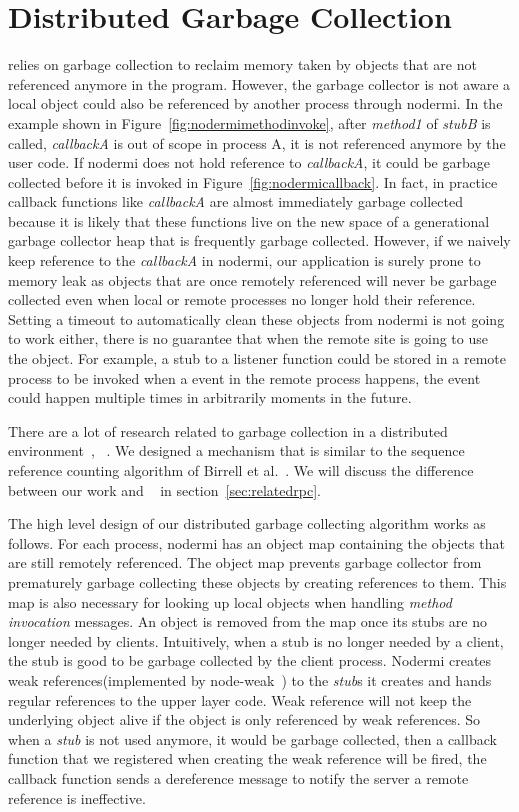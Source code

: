\section{Distributed Garbage Collection}
\js{} relies on garbage collection to reclaim memory taken by
objects that are not referenced anymore in the program.
However, the garbage collector is not aware a local object
could also be referenced by another process through nodermi.
In the example shown in Figure~\ref{fig:nodermimethodinvoke},
after \emph{method1} of \emph{stubB} is called,
\emph{callbackA} is out of scope in process A,
it is not referenced anymore by the user code.
If nodermi does not hold reference to \emph{callbackA},
it could be garbage collected before it is invoked in Figure~\ref{fig:nodermicallback}.
In fact, in practice callback functions like \emph{callbackA} are almost
immediately garbage collected because it is likely that these functions
live on the new space of a generational garbage collector heap that is frequently
garbage collected.
However, if we naively keep reference to the \emph{callbackA} in nodermi,
our application is surely prone to memory leak as objects that are once remotely
referenced
will never be garbage collected even when local or remote processes no longer hold their reference.
Setting a timeout to automatically clean these objects from nodermi
 is not going to work either,
there is no guarantee that when the remote site is going to use the object.
For example,
a stub to a listener function could be stored in a remote process
to be invoked when a event in the remote process happens,
the event could happen multiple times in arbitrarily moments in the future.


There are a lot of research related to garbage collection in a distributed
environment~\cite{abdullahi1998garbage}, ~\cite{birrell1993distributed}.
We designed a mechanism that is similar to the sequence reference counting algorithm
of Birrell et al.~\cite{birrell1993distributed}.
We will discuss the difference between our work and ~\cite{birrell1993distributed}
in section~\ref{sec:relatedrpc}.

The high level design of our distributed garbage collecting 
algorithm works as follows.
For each process, nodermi has an object map containing the objects 
that are still remotely referenced.
The object map prevents garbage collector from prematurely garbage collecting
these objects by creating references to them.
This map is also necessary for looking up local objects 
when handling \emph{method invocation} messages.
An object is removed from the map once its stubs
are no longer needed by clients.
Intuitively,
when a stub is no longer needed by a client,
the stub is good to be garbage collected by the client process.
Nodermi creates weak references(implemented by node-weak~\cite{nodeweak}) 
to the \emph{stub}s it creates
and hands regular references to the upper layer code.
Weak reference will not keep the underlying object alive
if the object is only referenced by weak references.
So when a \emph{stub} is not used anymore,
it would be garbage collected,
then a callback function that we registered when creating the weak
reference will be fired,
the callback function sends a dereference message to notify the server
a remote reference is ineffective.


